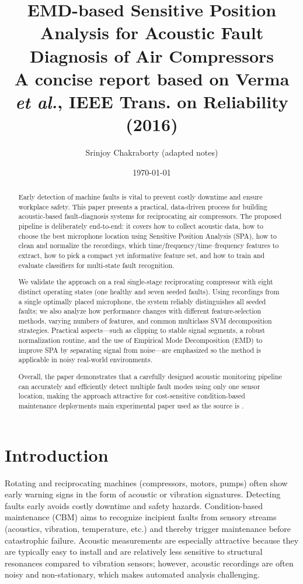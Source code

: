 \documentclass[12pt,a4paper]{article}
\title{EMD-based Sensitive Position Analysis for Acoustic Fault Diagnosis of Air Compressors\\
\vspace{6pt}
\large A concise report based on Verma \textit{et al.}, IEEE Trans. on Reliability (2016)}
\author{Srinjoy Chakraborty (adapted notes)}
\date{\today}
\begin{document}
\newpage




\tableofcontents
\newpage
\begin{abstract}
Early detection of machine faults is vital to prevent costly downtime and ensure workplace safety. This paper presents a practical, data-driven process for building acoustic-based fault-diagnosis systems for reciprocating air compressors. The proposed pipeline is deliberately end-to-end: it covers how to collect acoustic data, how to choose the best microphone location using Sensitive Position Analysis (SPA), how to clean and normalize the recordings, which time/frequency/time–frequency features to extract, how to pick a compact yet informative feature set, and how to train and evaluate classifiers for multi-state fault recognition.

We validate the approach on a real single-stage reciprocating compressor with eight distinct operating states (one healthy and seven seeded faults). Using recordings from a single optimally placed microphone, the system reliably distinguishes all seeded faults; we also analyze how performance changes with different feature-selection methods, varying numbers of features, and common multiclass SVM decomposition strategies. Practical aspects—such as clipping to stable signal segments, a robust normalization routine, and the use of Empirical Mode Decomposition (EMD) to improve SPA by separating signal from noise—are emphasized so the method is applicable in noisy real-world environments.

Overall, the paper demonstrates that a carefully designed acoustic monitoring pipeline can accurately and efficiently detect multiple fault modes using only one sensor location, making the approach attractive for cost-sensitive condition-based maintenance deployments main experimental paper used as the source is \cite{Verma2016}.
\end{abstract}
\section{Introduction}
Rotating and reciprocating machines (compressors, motors, pumps) often show early warning signs in the form of acoustic or vibration signatures. Detecting faults early avoids costly downtime and safety hazards. Condition-based maintenance (CBM) aims to recognize incipient faults from sensory streams (acoustics, vibration, temperature, etc.) and thereby trigger maintenance before catastrophic failure. Acoustic measurements are especially attractive because they are typically easy to install and are relatively less sensitive to structural resonances compared to vibration sensors; however, acoustic recordings are often noisy and non-stationary, which makes automated analysis challenging.
\end{document}
